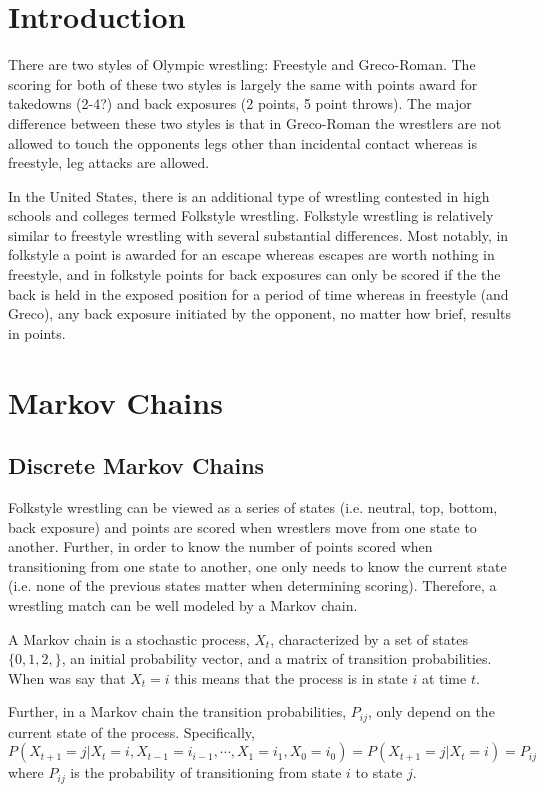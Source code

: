 \documentclass{article}\usepackage[]{graphicx}\usepackage[]{color}
\begin{document}
\section{Introduction}
There are two styles of Olympic wrestling: Freestyle and Greco-Roman.  The scoring for both of these two styles is largely the same with points award for takedowns (2-4?) and back exposures (2 points, 5 point throws).  The major difference between these two styles is that in Greco-Roman the wrestlers are not allowed to touch the opponents legs other than incidental contact whereas is freestyle, leg attacks are allowed.  

In the United States, there is an additional type of wrestling contested in high schools and colleges termed Folkstyle wrestling.  Folkstyle wrestling is relatively similar to freestyle wrestling with several substantial differences.  Most notably, in folkstyle a point is awarded for an escape whereas escapes are worth nothing in freestyle, and in folkstyle points for back exposures can only be scored if the the back is held in the exposed position for a period of time whereas in freestyle (and Greco), any back exposure initiated by the opponent, no matter how brief, results in points.  

\section{Markov Chains}
\subsection{Discrete Markov Chains}
Folkstyle wrestling can be viewed as a series of states (i.e. neutral, top, bottom, back exposure) and points are scored when wrestlers move from one state to another.  Further, in order to know the number of points scored when transitioning from one state to another, one only needs to know the current state (i.e. none of the previous states matter when determining scoring).  Therefore, a wrestling match can be well modeled by a Markov chain.   

A Markov chain \citep{Ross2003} is a stochastic process, $X_t$, characterized by a set of states $\{0, 1, 2, \}$, an initial probability vector, and a matrix of transition probabilities.  When was say that $X_t = i$ this means that the process is in state $i$ at time $t$.  

Further, in a Markov chain the transition probabilities, $P_{ij}$, only depend on the current state of the process.  Specifically, 
$P(X_{t+1} = j|X_{t} = i, X_{t-1} = i_{i-1}, \cdots, X_{1} = i_{1}, X_{0} = i_{0}) = P(X_{t+1} = j|X_{t} = i) =  P_{ij}$ where $P_{ij}$ is the probability of transitioning from state $i$ to state $j$.    
\end{document}
